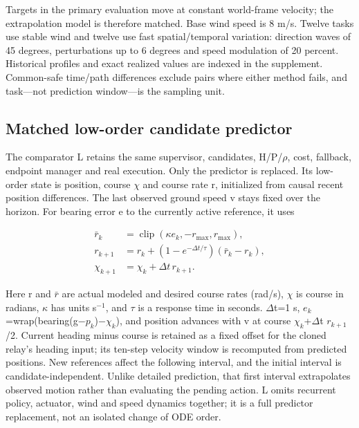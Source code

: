 \documentclass[conference]{IEEEtran}
\begin{document}
Targets in the primary evaluation move at constant world-frame velocity; the extrapolation model is therefore matched. Base wind speed is 8 m/s. Twelve tasks use stable wind and twelve use fast spatial/temporal variation: direction waves of 45 degrees, perturbations up to 6 degrees and speed modulation of 20 percent. Historical profiles and exact realized values are indexed in the supplement. Common-safe time/path differences exclude pairs where either method fails, and task---not prediction window---is the sampling unit.

\subsection{Matched low-order candidate predictor}

The comparator L retains the same supervisor, candidates, H/P/\ensuremath{\rho}, cost, fallback, endpoint manager and real execution. Only the predictor is replaced. Its low-order state is position, course \ensuremath{\chi} and course rate r, initialized from causal recent position differences. The last observed ground speed v stays fixed over the horizon. For bearing error e to the currently active reference, it uses

\begin{equation}\label{eq:6}
\begin{aligned}\bar r_k&=\operatorname{clip}(\kappa e_k,-r_{\max},r_{\max}),\\r_{k+1}&=r_k+(1-e^{-\Delta t/\tau})(\bar r_k-r_k),\\\chi_{k+1}&=\chi_k+\Delta t\,r_{k+1}.\end{aligned}
\end{equation}

Here r and $\bar r$ are actual modeled and desired course rates (rad/s), \ensuremath{\chi} is course in radians, \ensuremath{\kappa} has units s$^{-1}$, and \ensuremath{\tau} is a response time in seconds. \ensuremath{\Delta}t=1 s, $e_k$=wrap(bearing(g\ensuremath{-}$p_k$)\ensuremath{-}$\chi_k$), and position advances with v at course $\chi_k$+\ensuremath{\Delta}t $r_{k+1}$/2. Current heading minus course is retained as a fixed offset for the cloned relay's heading input; its ten-step velocity window is recomputed from predicted positions. New references affect the following interval, and the initial interval is candidate-independent. Unlike detailed prediction, that first interval extrapolates observed motion rather than evaluating the pending action. L omits recurrent policy, actuator, wind and speed dynamics together; it is a full predictor replacement, not an isolated change of ODE order.
\end{document}
